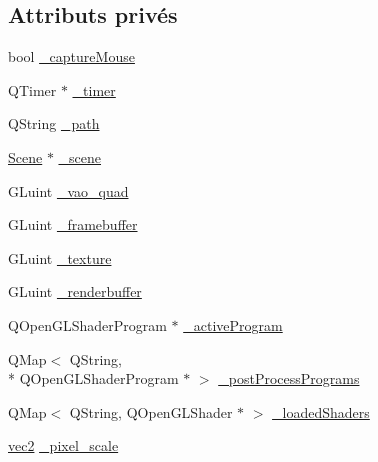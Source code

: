 \subsection*{Attributs privés}
\begin{DoxyCompactItemize}
\item 
bool \hyperlink{class_my_open_g_l_widget_af001d889fec5469aa3e67c11ae48b29d}{\+\_\+capture\+Mouse}
\item 
Q\+Timer $\ast$ \hyperlink{class_my_open_g_l_widget_aa6ba509f0ef6e8c2d266b83e1d380eb8}{\+\_\+timer}
\item 
Q\+String \hyperlink{class_my_open_g_l_widget_a7b3d69ddf0b3509a196edbfeb78407c6}{\+\_\+path}
\item 
\hyperlink{class_scene}{Scene} $\ast$ \hyperlink{class_my_open_g_l_widget_a26a1f259357dd7c8822d715d81591395}{\+\_\+scene}
\item 
G\+Luint \hyperlink{class_my_open_g_l_widget_a63a814817d1af6ea49036edac108183b}{\+\_\+vao\+\_\+quad}
\item 
G\+Luint \hyperlink{class_my_open_g_l_widget_ab39ecf367a98c1bd5e1dbeeb8b44a255}{\+\_\+framebuffer}
\item 
G\+Luint \hyperlink{class_my_open_g_l_widget_a18d7f106f5e12568f5db59d8c4a71706}{\+\_\+texture}
\item 
G\+Luint \hyperlink{class_my_open_g_l_widget_a8385a49fb5113010acc3ddd67080ed1a}{\+\_\+renderbuffer}
\item 
Q\+Open\+G\+L\+Shader\+Program $\ast$ \hyperlink{class_my_open_g_l_widget_a24571f61604a92b622b49609bc0f3f5b}{\+\_\+active\+Program}
\item 
Q\+Map$<$ Q\+String, \\*
Q\+Open\+G\+L\+Shader\+Program $\ast$ $>$ \hyperlink{class_my_open_g_l_widget_afde13326f4f01ede3cac0ee4f389a594}{\+\_\+post\+Process\+Programs}
\item 
Q\+Map$<$ Q\+String, Q\+Open\+G\+L\+Shader $\ast$ $>$ \hyperlink{class_my_open_g_l_widget_ab02762bc0b4cb541f7ad42fdbd7a73f7}{\+\_\+loaded\+Shaders}
\item 
\hyperlink{structvec2}{vec2} \hyperlink{class_my_open_g_l_widget_a543e9cc55491a8e07a7bb5eb54633351}{\+\_\+pixel\+\_\+scale}
\end{DoxyCompactItemize}


